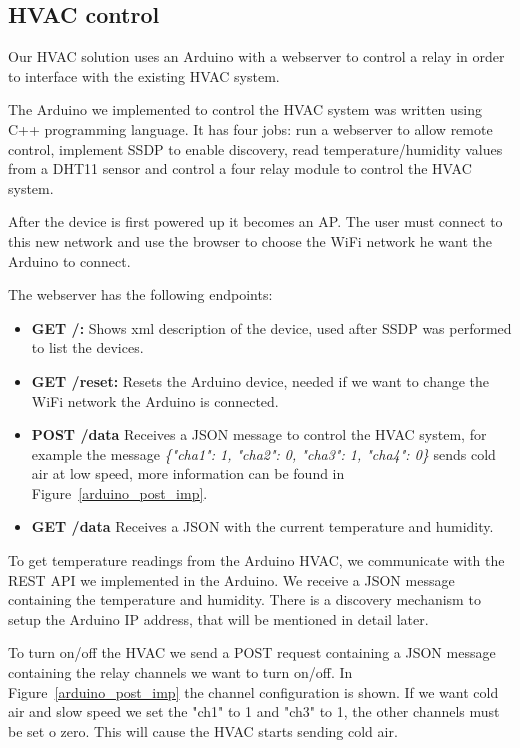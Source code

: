\subsection{HVAC control}

Our HVAC solution uses an Arduino with a webserver to control a relay in order to interface with the existing HVAC system.

The Arduino we implemented to control the HVAC system was written using C++ programming language. It has four jobs: run a webserver to allow remote control, implement \ac{SSDP} to enable discovery, read temperature/humidity values from a DHT11 sensor and control a four relay module to control the HVAC system.

After the device is first powered up it becomes an \ac{AP}. The user must connect to this new network and use the browser to choose the \ac{WiFi} network he want the Arduino to connect.


The webserver has the following endpoints:


\begin{itemize}
  \item \textbf{GET /:} Shows xml description of the device, used after \ac{SSDP} was performed to list the devices.
  \item \textbf{GET /reset:} Resets the Arduino device, needed if we want to change the WiFi network the Arduino is connected.
  \item \textbf{POST /data} Receives a JSON message to control the HVAC system, for example the message \textit{\{"cha1": 1, "cha2": 0, "cha3": 1, "cha4": 0\}} sends cold air at low speed, more information can be found in Figure~\ref{arduino_post_imp}.
  
  \item \textbf{GET /data} Receives a JSON with the current temperature and humidity.
 
\end{itemize}


To get temperature readings from the Arduino \ac{HVAC}, we communicate with the \ac{REST} \ac{API} we implemented in the Arduino. We receive a \ac{JSON} message containing the temperature and humidity. There is a discovery mechanism to setup the Arduino IP address, that will be mentioned in detail later.

To turn on/off the \ac{HVAC} we send a POST request containing a \ac{JSON} message containing the relay channels we want to turn on/off. In Figure~\ref{arduino_post_imp} the channel configuration is shown. If we want cold air   and slow speed we set the "ch1" to 1 and "ch3" to 1, the other channels must be set o zero. This will cause the \ac{HVAC} starts sending cold air.


